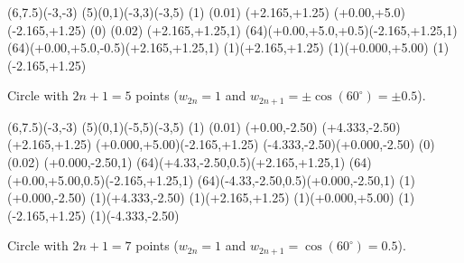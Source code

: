 \pagebreak

\parskip1cm
\begin{center}

\begin{lapdf}(6,7.5)(-3,-3)
 \Lingrid(5)(0,1)(-3,3)(-3,5)
 \Dash(1)
 \Setwidth(0.01)
 \Polygon(+2.165,+1.25)
 (+0.00,+5.0)(-2.165,+1.25) \Stroke
 \Dash(0)
 \Red
 \Setwidth(0.02)
 \Rmoveto(+2.165,+1.25,1)
 \Rcurveto(64)(+0.00,+5.0,+0.5)(-2.165,+1.25,1)
 \Rcurveto(64)(+0.00,+5.0,-0.5)(+2.165,+1.25,1) \Stroke
 \Black
 \Point(1)(+2.165,+1.25)
 \Point(1)(+0.000,+5.00)
 \Point(1)(-2.165,+1.25)
\end{lapdf}

Circle with $2n+1=5$ points ($w_{2n}=1$ and $w_{2n+1} = \pm \cos(60^\circ) = \pm 0.5$).
\end{center}
\begin{center}

\begin{lapdf}(6,7.5)(-3,-3)
 \Lingrid(5)(0,1)(-5,5)(-3,5)
 \Dash(1)
 \Setwidth(0.01)
 \Polygon(+0.00,-2.50)
 (+4.333,-2.50)(+2.165,+1.25)
 (+0.000,+5.00)(-2.165,+1.25)
 (-4.333,-2.50)(+0.000,-2.50) \Stroke
 \Dash(0)
 \Setwidth(0.02)
 \Red
 \Rmoveto(+0.000,-2.50,1)
 \Rcurveto(64)(+4.33,-2.50,0.5)(+2.165,+1.25,1)
 \Rcurveto(64)(+0.00,+5.00,0.5)(-2.165,+1.25,1)
 \Rcurveto(64)(-4.33,-2.50,0.5)(+0.000,-2.50,1) \Stroke
 \Black
 \Point(1)(+0.000,-2.50)
 \Point(1)(+4.333,-2.50)
 \Point(1)(+2.165,+1.25)
 \Point(1)(+0.000,+5.00)
 \Point(1)(-2.165,+1.25)
 \Point(1)(-4.333,-2.50)
\end{lapdf}

Circle with $2n+1=7$ points ($w_{2n}=1$ and $w_{2n+1} = \cos(60^\circ) = 0.5$).
\end{center}

\pagebreak

